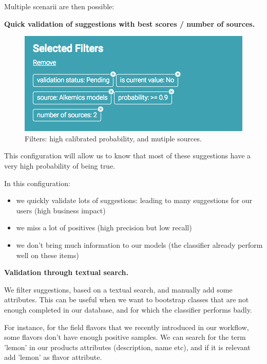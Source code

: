 Multiple scenarii are then possible:

\textbf{Quick validation of suggestions with best scores / number of sources.}

\begin{figure}[H]
\centering
\includegraphics[scale=0.50]{./images/calibration/easy-validation.png}
\caption{Filters: high calibrated probability, and mutiple sources.}
\end{figure}

This configuration will allow us to know that most of these suggestions have a very high probability of being true. 

In this configuration:
\begin{itemize}
	\item we quickly validate lots of suggestions: leading to many suggestions for our users (high business impact)
	\item we miss a lot of positives (high precision but low recall)
	\item we don't bring much information to our models (the classifier already perform well on these items)
\end{itemize}


\textbf{Validation through textual search.}

We filter suggestions, based on a textual search, and manually add some attributes. This can be useful when we want to bootstrap classes that are not enough completed in our database, and for which the classifier performs badly.

For instance, for the field flavors that we recently introduced in our workflow, some flavors don't have enough positive samples. 
We can search for the term 'lemon' in our products attributes (description, name etc), and if it is relevant add 'lemon' as flavor attribute.

